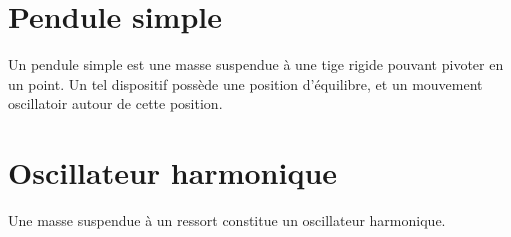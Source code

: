 
\section{Pendule simple}
%



Un pendule simple est une masse suspendue à une tige rigide pouvant pivoter en un point. Un tel dispositif possède une position d'équilibre, et un mouvement oscillatoir autour de cette position.



\section{Oscillateur harmonique}

Une masse suspendue à un ressort constitue un oscillateur harmonique.

